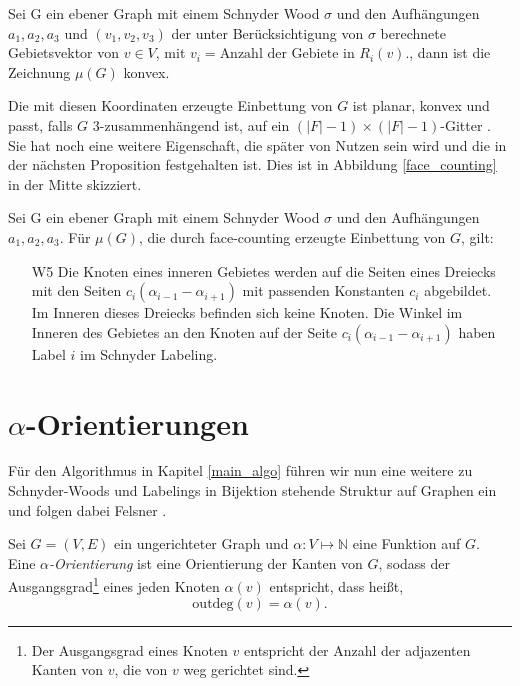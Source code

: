 \begin{theorem}
Sei G ein ebener Graph mit einem Schnyder Wood $\sigma$ und den Aufhängungen $a_1,a_2,a_3$ und $(v_1,v_2,v_3)$ der unter Berücksichtigung von $\sigma$ berechnete Gebietsvektor von $v \in V$, mit $ v_i = \text{Anzahl der Gebiete in }R_i(v).$, dann ist die Zeichnung $\mu(G)$ konvex.
\end{theorem}

Die mit diesen Koordinaten erzeugte Einbettung von $G$ ist planar, konvex und passt, falls $G$ 3-zusammenhängend ist, auf ein $(|F|-1)\times(|F|-1)$-Gitter \cite[Korollar 2.8]{felsner12}. Sie hat noch eine weitere Eigenschaft, die später von Nutzen sein wird und die in der nächsten Proposition festgehalten ist.  Dies ist in Abbildung \ref{face_counting} in der Mitte skizziert.

\begin{proposition}\label{w5}
Sei G ein ebener Graph mit einem Schnyder Wood $\sigma$ und den Aufhängungen $a_1,a_2,a_3$. Für $\mu(G)$, die durch face-counting erzeugte Einbettung von $G$, gilt:
\begin{itemize}
\item [W5] Die Knoten eines inneren Gebietes werden auf die Seiten eines Dreiecks mit den Seiten $c_i(\alpha_{i-1}-\alpha_{i+1})$ mit passenden Konstanten $c_i$ abgebildet. Im Inneren dieses Dreiecks befinden sich keine Knoten. Die Winkel im Inneren des Gebietes an den Knoten auf der Seite $c_i(\alpha_{i-1}-\alpha_{i+1})$ haben Label $i$ im Schnyder Labeling.
\end{itemize}
\end{proposition}

\section{$\alpha$-Orientierungen}\label{alpha_orientations}

Für den Algorithmus in Kapitel \ref{main_algo} führen wir nun eine weitere zu Schnyder-Woods und Labelings in Bijektion stehende Struktur auf Graphen ein und folgen dabei Felsner \cite{felsner04}.

\begin{definition}
Sei $G=(V,E)$ ein ungerichteter Graph und $\alpha:V\mapsto\mathbb{N}$ eine Funktion auf $G$. Eine $\alpha$\textit{-Orientierung} ist eine Orientierung der Kanten von $G$, sodass der Ausgangsgrad\footnote{Der Ausgangsgrad eines Knoten $v$ entspricht der Anzahl der adjazenten Kanten von $v$, die von $v$ weg gerichtet sind.} eines jeden Knoten $\alpha(v)$ entspricht, dass heißt, $$\text{outdeg}(v) = \alpha(v).$$
\end{definition}

